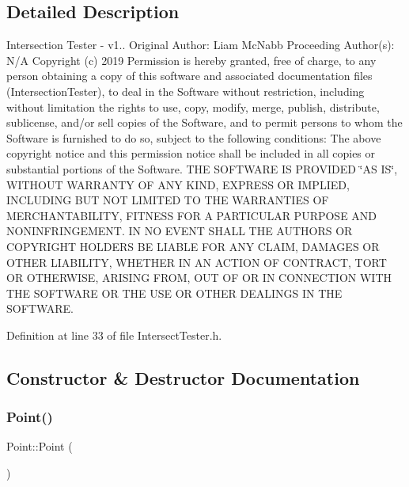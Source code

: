\subsection{Detailed Description}
Intersection Tester -\/ v1.. Original Author\+: Liam Mc\+Nabb Proceeding Author(s)\+: N/A Copyright (c) 2019 Permission is hereby granted, free of charge, to any person obtaining a copy of this software and associated documentation files (Intersection\+Tester), to deal in the Software without restriction, including without limitation the rights to use, copy, modify, merge, publish, distribute, sublicense, and/or sell copies of the Software, and to permit persons to whom the Software is furnished to do so, subject to the following conditions\+: The above copyright notice and this permission notice shall be included in all copies or substantial portions of the Software. T\+HE S\+O\+F\+T\+W\+A\+RE IS P\+R\+O\+V\+I\+D\+ED \char`\"{}\+A\+S I\+S\char`\"{}, W\+I\+T\+H\+O\+UT W\+A\+R\+R\+A\+N\+TY OF A\+NY K\+I\+ND, E\+X\+P\+R\+E\+SS OR I\+M\+P\+L\+I\+ED, I\+N\+C\+L\+U\+D\+I\+NG B\+UT N\+OT L\+I\+M\+I\+T\+ED TO T\+HE W\+A\+R\+R\+A\+N\+T\+I\+ES OF M\+E\+R\+C\+H\+A\+N\+T\+A\+B\+I\+L\+I\+TY, F\+I\+T\+N\+E\+SS F\+OR A P\+A\+R\+T\+I\+C\+U\+L\+AR P\+U\+R\+P\+O\+SE A\+ND N\+O\+N\+I\+N\+F\+R\+I\+N\+G\+E\+M\+E\+NT. IN NO E\+V\+E\+NT S\+H\+A\+LL T\+HE A\+U\+T\+H\+O\+RS OR C\+O\+P\+Y\+R\+I\+G\+HT H\+O\+L\+D\+E\+RS BE L\+I\+A\+B\+LE F\+OR A\+NY C\+L\+A\+IM, D\+A\+M\+A\+G\+ES OR O\+T\+H\+ER L\+I\+A\+B\+I\+L\+I\+TY, W\+H\+E\+T\+H\+ER IN AN A\+C\+T\+I\+ON OF C\+O\+N\+T\+R\+A\+CT, T\+O\+RT OR O\+T\+H\+E\+R\+W\+I\+SE, A\+R\+I\+S\+I\+NG F\+R\+OM, O\+UT OF OR IN C\+O\+N\+N\+E\+C\+T\+I\+ON W\+I\+TH T\+HE S\+O\+F\+T\+W\+A\+RE OR T\+HE U\+SE OR O\+T\+H\+ER D\+E\+A\+L\+I\+N\+GS IN T\+HE S\+O\+F\+T\+W\+A\+RE. 

Definition at line 33 of file Intersect\+Tester.\+h.



\subsection{Constructor \& Destructor Documentation}
\mbox{\label{class_point_ad92f2337b839a94ce97dcdb439b4325a}} 
\subsubsection{\texorpdfstring{Point()}{Point()}\hspace{0.1cm}{\footnotesize\ttfamily [1/3]}}
{\footnotesize\ttfamily Point\+::\+Point (\begin{DoxyParamCaption}{ }\end{DoxyParamCaption})\hspace{0.3cm}{\ttfamily [inline]}}




